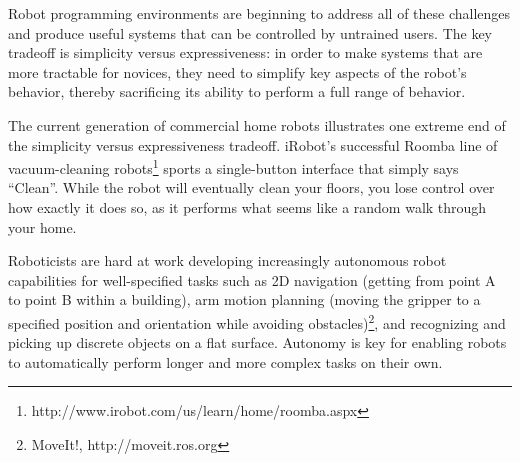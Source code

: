 \documentclass[10pt,twocolumn]{article}
\begin{document}
Robot programming environments are beginning to address all of these challenges and produce useful systems that can be controlled by untrained users. The key tradeoff is simplicity versus expressiveness: in order to make systems that are more tractable for novices, they need to simplify key aspects of the robot's behavior, thereby sacrificing its ability to perform a full range of behavior.

The current generation of commercial home robots illustrates one extreme end of the simplicity versus expressiveness tradeoff. iRobot's successful Roomba line of vacuum-cleaning robots\footnote{http://www.irobot.com/us/learn/home/roomba.aspx} sports a single-button interface that simply says ``Clean''. While the robot will eventually clean your floors, you lose control over how exactly it does so, as it performs what seems like a random walk through your home.



Roboticists are hard at work developing increasingly autonomous robot capabilities for well-specified tasks such as 2D navigation (getting from point A to point B within a building), arm motion planning (moving the gripper to a specified position and orientation while avoiding obstacles)\footnote{MoveIt!, http://moveit.ros.org}, and recognizing and picking up discrete objects on a flat surface. Autonomy is key for enabling robots to automatically perform longer and more complex tasks on their own.
\end{document}
